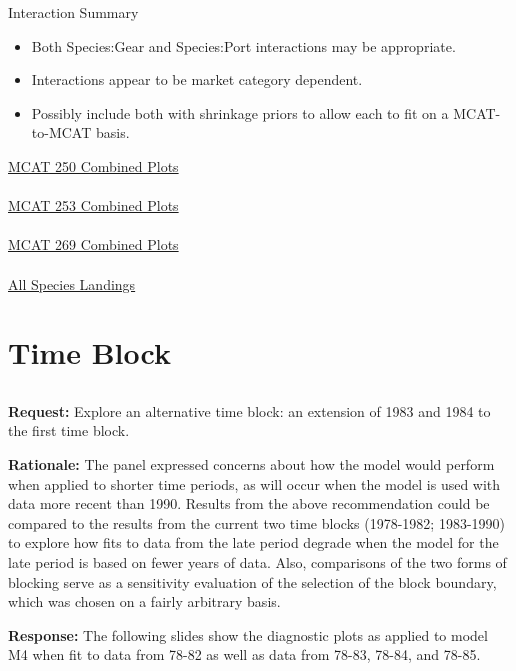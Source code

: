 \documentclass[ xcolor = pdftex, dvipsnames, table ]{beamer}
\begin{document}
%
\begin{frame}{Interaction Summary}	
        \begin{minipage}{0.49\textwidth}
	\begin{itemize}
	\item Both Species:Gear and Species:Port interactions may be appropriate.
	\item Interactions appear to be market category dependent.
	\item Possibly include both with shrinkage priors to allow each to fit on a MCAT-to-MCAT basis. 
	\end{itemize}
	\end{minipage}
        \begin{minipage}{0.49\textwidth}
	\begin{center}
	\href{https://github.com/gasduster99/sppComp/tree/master/try1/postSSC/25019781982M4IGSPSG}{MCAT 250 Combined Plots}\\$~$\\
	\href{https://github.com/gasduster99/sppComp/tree/master/try1/postSSC/25319781982M4IGSPSG}{MCAT 253 Combined Plots}\\$~$\\
	\href{https://github.com/gasduster99/sppComp/tree/master/try1/postSSC/26919781982M4IGSPSG}{MCAT 269 Combined Plots}\\$~$\\
	\href{https://github.com/gasduster99/sppComp/tree/master/try1/postSSC/landDiagnostics/M4IGSPSG}{All Species Landings}
	\end{center}
	\end{minipage}
\end{frame}

%
%

\section{Time Block}
\subsection{}
\begin{frame}
\small
\textbf{Request:}  
Explore an alternative time block: an extension of 1983 and 1984 to the first 
time block.

\textbf{Rationale:}
The panel expressed concerns about how the model would perform when applied to 
shorter time periods, as will occur when the model is used with data more 
recent than 1990.  Results from the above recommendation could be compared to 
the results from the current two time blocks (1978-1982; 1983-1990) to explore 
how fits to data from the late period degrade when the model for the late 
period is based on fewer years of data.  Also, comparisons of the two forms of 
blocking serve as a sensitivity evaluation of the selection of the block 
boundary, which was chosen on a fairly arbitrary basis.

\textbf{Response:} 
The following slides show the diagnostic plots as applied to model M4 when fit 
to data from 78-82 as well as data from 78-83, 78-84, and 78-85.

\end{frame}
\end{document}

